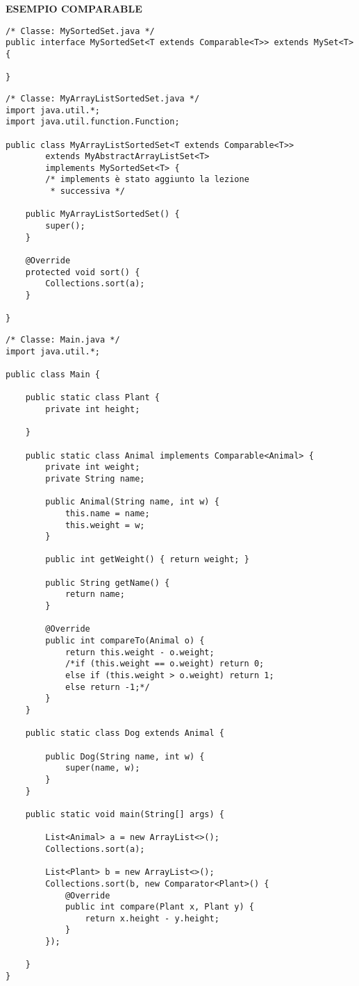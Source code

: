 \noindent \textbf{ESEMPIO COMPARABLE}
\begin{lstlisting}[basicstyle=\small,]
/* Classe: MySortedSet.java */
public interface MySortedSet<T extends Comparable<T>> extends MySet<T> {

}
\end{lstlisting}

\begin{lstlisting}[basicstyle=\small,]
/* Classe: MyArrayListSortedSet.java */
import java.util.*;
import java.util.function.Function;

public class MyArrayListSortedSet<T extends Comparable<T>>
        extends MyAbstractArrayListSet<T>
        implements MySortedSet<T> {
        /* implements è stato aggiunto la lezione
         * successiva */

    public MyArrayListSortedSet() {
        super();
    }

    @Override
    protected void sort() {
        Collections.sort(a);
    }

}
\end{lstlisting}

\begin{lstlisting}[basicstyle=\small,]
/* Classe: Main.java */
import java.util.*;

public class Main {

    public static class Plant {
        private int height;

    }

    public static class Animal implements Comparable<Animal> {
        private int weight;
        private String name;

        public Animal(String name, int w) {
            this.name = name;
            this.weight = w;
        }

        public int getWeight() { return weight; }

        public String getName() {
            return name;
        }

        @Override
        public int compareTo(Animal o) {
            return this.weight - o.weight;
            /*if (this.weight == o.weight) return 0;
            else if (this.weight > o.weight) return 1;
            else return -1;*/
        }
    }

    public static class Dog extends Animal {

        public Dog(String name, int w) {
            super(name, w);
        }
    }

    public static void main(String[] args) {

        List<Animal> a = new ArrayList<>();
        Collections.sort(a);

        List<Plant> b = new ArrayList<>();
        Collections.sort(b, new Comparator<Plant>() {
            @Override
            public int compare(Plant x, Plant y) {
                return x.height - y.height;
            }
        });

    }
}
\end{lstlisting}
